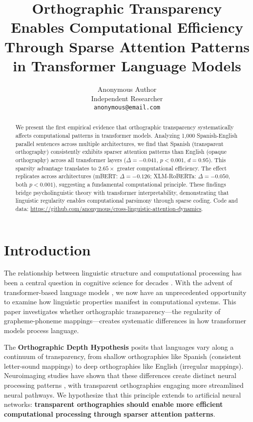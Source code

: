 \documentclass[11pt,a4paper]{article}
\title{Orthographic Transparency Enables Computational Efficiency\\
Through Sparse Attention Patterns in Transformer Language Models}
\author{Anonymous Author \\
  Independent Researcher \\
  \texttt{anonymous@email.com}}
\begin{document}
\maketitle

\begin{abstract}
We present the first empirical evidence that orthographic transparency systematically affects computational patterns in transformer models. Analyzing 1,000 Spanish-English parallel sentences across multiple architectures, we find that Spanish (transparent orthography) consistently exhibits sparser attention patterns than English (opaque orthography) across all transformer layers ($\Delta = -0.041$, $p < 0.001$, $d = 0.95$). This sparsity advantage translates to $2.65\times$ greater computational efficiency. The effect replicates across architectures (mBERT: $\Delta = -0.126$; XLM-RoBERTa: $\Delta = -0.050$, both $p < 0.001$), suggesting a fundamental computational principle. These findings bridge psycholinguistic theory with transformer interpretability, demonstrating that linguistic regularity enables computational parsimony through sparse coding. Code and data: \url{https://github.com/anonymous/cross-linguistic-attention-dynamics}.
\end{abstract}

\section{Introduction}

The relationship between linguistic structure and computational processing has been a central question in cognitive science for decades \cite{chomsky1965,marr1982}. With the advent of transformer-based language models \cite{vaswani2017attention}, we now have an unprecedented opportunity to examine how linguistic properties manifest in computational systems. This paper investigates whether orthographic transparency---the regularity of grapheme-phoneme mappings---creates systematic differences in how transformer models process language.

The \textbf{Orthographic Depth Hypothesis} \cite{katz1992} posits that languages vary along a continuum of transparency, from shallow orthographies like Spanish (consistent letter-sound mappings) to deep orthographies like English (irregular mappings). Neuroimaging studies have shown that these differences create distinct neural processing patterns \cite{paulesu2000}, with transparent orthographies engaging more streamlined neural pathways. We hypothesize that this principle extends to artificial neural networks: \textbf{transparent orthographies should enable more efficient computational processing through sparser attention patterns}.
\end{document}
